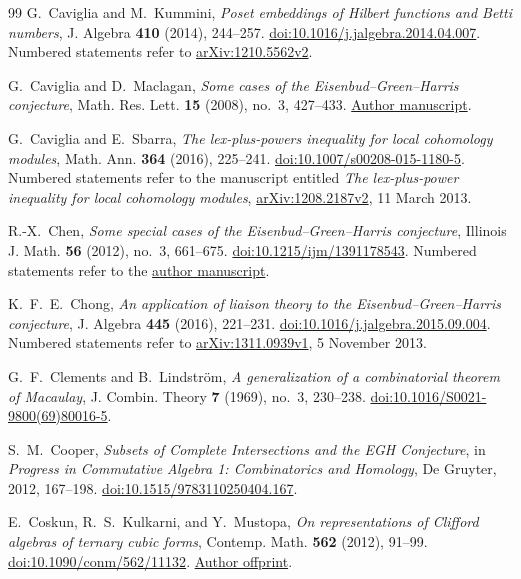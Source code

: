 \begin{thebibliography}{99}
G.~Caviglia and M.~Kummini,
\emph{Poset embeddings of Hilbert functions and Betti numbers},
J. Algebra \textbf{410} (2014), 244--257.
\href{https://doi.org/10.1016/j.jalgebra.2014.04.007}{doi:10.1016/j.jalgebra.2014.04.007}.
Numbered statements refer to
\href{https://arxiv.org/abs/1210.5562v2}{arXiv:1210.5562v2}.

G.~Caviglia and D.~Maclagan,
\emph{Some cases of the Eisenbud--Green--Harris conjecture},
Math. Res. Lett. \textbf{15} (2008), no.~3, 427--433.
\href{https://www.math.purdue.edu/~gcavigli/Articles-PDF/%5B4%5D.pdf}{Author manuscript}.

G.~Caviglia and E.~Sbarra,
\emph{The lex-plus-powers inequality for local cohomology modules},
Math. Ann. \textbf{364} (2016), 225--241.
\href{https://doi.org/10.1007/s00208-015-1180-5}{doi:10.1007/s00208-015-1180-5}.
Numbered statements refer to the manuscript entitled
\emph{The lex-plus-power inequality for local cohomology modules},
\href{https://arxiv.org/pdf/1208.2187v2}{\mbox{arXiv:1208.2187v2}},
11 March 2013.

R.-X.~Chen,
\emph{Some special cases of the Eisenbud--Green--Harris conjecture},
Illinois J. Math. \textbf{56} (2012), no.~3, 661--675.
\href{https://doi.org/10.1215/ijm/1391178543}{doi:10.1215/ijm/1391178543}.
Numbered statements refer to the
\href{https://pi.math.cornell.edu/~rxc/Chen-EGH.pdf}{author manuscript}.

K.~F.~E.~Chong,
\emph{An application of liaison theory to the Eisenbud--Green--Harris conjecture},
J. Algebra \textbf{445} (2016), 221--231.
\href{https://doi.org/10.1016/j.jalgebra.2015.09.004}{doi:10.1016/j.jalgebra.2015.09.004}.
Numbered statements refer to
\href{https://arxiv.org/abs/1311.0939v1}{arXiv:1311.0939v1},
5 November 2013.

G.~F.~Clements and B.~Lindstr\"om,
\emph{A generalization of a combinatorial theorem of Macaulay},
J. Combin. Theory \textbf{7} (1969), no.~3, 230--238.
\href{https://doi.org/10.1016/S0021-9800(69)80016-5}{doi:10.1016/S0021-9800(69)80016-5}.

S.~M.~Cooper,
\emph{Subsets of Complete Intersections and the EGH Conjecture},
in \emph{Progress in Commutative Algebra 1: Combinatorics and Homology},
De Gruyter, 2012, 167--198.
\href{https://doi.org/10.1515/9783110250404.167}{doi:10.1515/9783110250404.167}.

E.~Coskun, R.~S.~Kulkarni, and Y.~Mustopa,
\emph{On representations of Clifford algebras of ternary cubic forms},
Contemp. Math. \textbf{562} (2012), 91--99.
\href{https://doi.org/10.1090/conm/562/11132}{doi:10.1090/conm/562/11132}.
\href{https://users.math.msu.edu/users/kulkar23/clifford.pdf}{Author offprint}.


\end{thebibliography}
